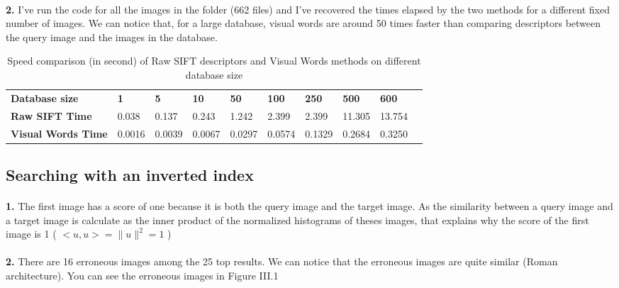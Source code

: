 \documentclass[11pt]{article}
\numberwithin{figure}{section} %
\begin{document}
\paragraph{}\textbf{2.} I've run the code for all the images in the folder (662 files) and I've recovered the times elapsed by the two methods for a different fixed number of images. \newline
We can notice that, for a large database, visual words are around 50 times faster than comparing descriptors between the query image and the images in the database.

\begin{table}[H]
\centering
\caption{Speed comparison (in second) of Raw SIFT descriptors and Visual Words methods on different database size}
\label{Times}
\begin{tabular}{llllllllll}
\rowcolor[HTML]{EFEFEF} 
{\color[HTML]{000000} \textbf{Database size}} & {\color[HTML]{000000} \textbf{1}} & {\color[HTML]{000000} \textbf{5}} & {\color[HTML]{000000} \textbf{10}} & {\color[HTML]{000000} \textbf{50}} & {\color[HTML]{000000} \textbf{100}} & {\color[HTML]{000000} \textbf{250}} & {\color[HTML]{000000} \textbf{500}} & {\color[HTML]{000000} \textbf{600}} \\
\textbf{Raw SIFT Time} & 0.038 & 0.137 & 0.243 & 1.242 & 2.399 & 2.399 & 11.305 & 13.754 \\
\textbf{Visual Words Time} & 0.0016 & 0.0039 & 0.0067 & 0.0297 & 0.0574 & 0.1329 & 0.2684  & 0.3250
\end{tabular}
\end{table}

\subsection{Searching with an inverted index}
\paragraph{}\textbf{1.} The first image has a score of one because it is both the query image and the target image. As the similarity between a query image and a target image is calculate as the inner product of the normalized histograms of theses images, that explains why the score of the first image is 1 ( $<u, u> = \| u\|^2 = 1$ )

\paragraph{}\textbf{2.} There are 16 erroneous images among the 25 top results. We can notice that the erroneous images are quite similar (Roman architecture). You can see the erroneous images in Figure III.1
\end{document}

